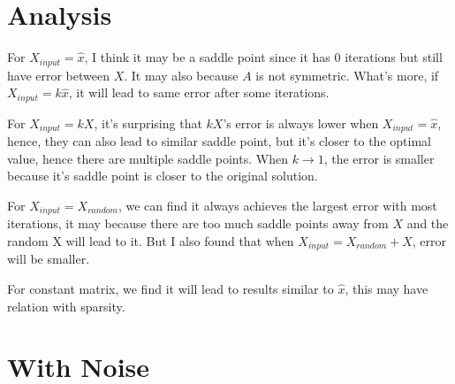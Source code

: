 \documentclass[a4paper]{article}
\begin{document}
\section{Analysis}
For $X_{input}=\hat{x}$, I think it may be a saddle point since it has 0 iterations but still have error between $X$. It may also because $A$ is not symmetric. What's more, if $X_{input}=k\hat{x}$, it will lead to same error after some iterations.
\par For $X_{input}=kX$, it's surprising that $kX$'s error is always lower when $X_{input}=\hat{x}$, hence, they can also lead to similar saddle point, but it's closer to the optimal value, hence there are multiple saddle points. When $k\rightarrow1$, the error is smaller because it's saddle point is closer to the original solution.
\par For $X_{input}=X_{random}$, we can find it always achieves the largest error with most iterations, it may because there are too much saddle points away from $X$ and the random X will lead to it. But I also found that when $X_{input}=X_{random}+X$, error will be smaller.
\par For constant matrix, we find it will lead to results similar to $\hat{x}$, this may have relation with sparsity.
\section{With Noise}
\end{document}
